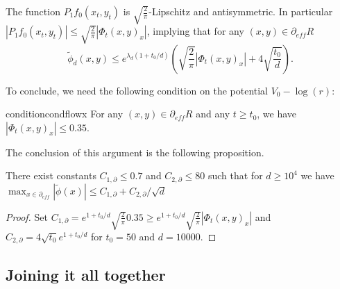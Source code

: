 The function $P_{1} f_0(x_t,y_t)$ is $\sqrt{\frac{2}{\pi}}$-Lipschitz and antisymmetric. In particular $|P_{1} f_0(x_t,y_t)|\le \sqrt{\frac{2}{\pi}}|\Phi_t(x,y)_x|$, implying that for any $(x,y) \in \partial_{eff} R$
\begin{equation}\label{eq:boundary_estimate}
    \tilde \phi_d (x, y) \le e^{\lambda_d (1+t_0/d)} \left(\sqrt{\frac{2}{\pi}}|\Phi_t(x,y)_x| + 4\sqrt{\frac{t_0}{d}}\right).
\end{equation}

To conclude, we need the following condition on the potential $V_0-\log(r)$:

\begin{restatable}{condition}{condflowx}
\label{cond:flow}
    For any $(x,y) \in \partial_{eff} R$ and any $t\ge t_0$, we have $|\Phi_t(x,y)_x|\le 0.35$. 
\end{restatable}

The conclusion of this argument is the following proposition.

\begin{proposition} \label{prop:small_on_boundary}
There exist constants $C_{1,\partial} \le 0.7$  and $C_{2,\partial} \le 80$ such that for $d\ge 10^4$ we have $\max_{x \in \partial_{eff}} |\tilde \phi (x)| \le C_{1,\partial} + C_{2,\partial}/\sqrt{d}$
\end{proposition}
\begin{proof}
    Set $C_{1,\partial} = e^{1+t_0/d}\sqrt{\frac{2}{\pi}} 0.35 \ge e^{1+t_0/d}\sqrt{\frac{2}{\pi}} |\Phi_t(x,y)_x|$ and $C_{2,\partial} = 4\sqrt{t_0}e^{1+t_0/d}$ for $t_0 = 50$ and $d=10000$.
\end{proof}


\subsection{Joining it all together}

